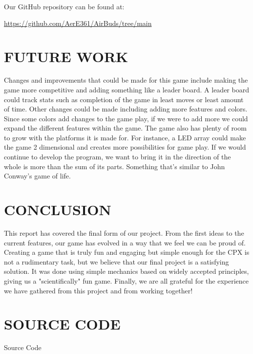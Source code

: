 \documentclass[12pt]{article}
\begin{document}
Our GitHub repository can be found at:

\url{https://github.com/AerE361/AirBuds/tree/main}


\section{FUTURE WORK}
Changes and improvements that could be made for this game include making the game more competitive and adding something like a leader board. A leader board could track stats such as completion of the game in least moves or least amount of time. Other changes could be made including adding more features and colors. Since some colors add changes to the game play, if we were to add more we could expand the different features within the game. 
The game also has plenty of room to grow with the platforms it is made for. For instance, a LED array could make the game 2 dimensional and creates more possibilities for game play.  If we would continue to develop the program, we want to bring it in the direction of the whole is more than the sum of its parts.  Something that's similar to John Conway's game of life. 

\section{CONCLUSION}
This report has covered the final form of our project. From the first ideas to the current features, our game has evolved in a way that we feel we can be proud of. Creating a game that is truly fun and engaging but simple enough for the CPX is not a rudimentary task, but we believe that our final project is a satisfying solution. It was done using simple mechanics based on widely accepted principles, giving us a "scientifically" fun game. Finally, we are all grateful for the experience we have gathered from this project and from working together!

\newpage



\newpage
\appendix

\section{SOURCE CODE}
Source Code

\end{document}
